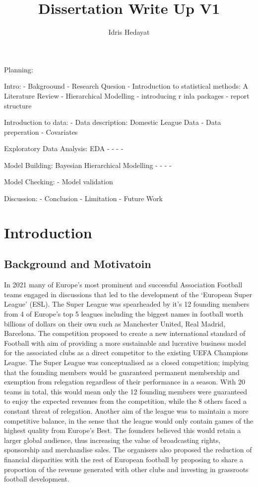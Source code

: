 \documentclass[
]{article}
\title{Dissertation Write Up V1}
\author{Idris Hedayat}
\date{}
\begin{document}
\maketitle

{
\setcounter{tocdepth}{2}
\tableofcontents
}
Planning:

Intro: - Bakgroound - Research Quesion - Introduction to statistical
methods: A Literature Review - Hierarchical Modelling - introducing r
inla packages - report structure

Introduction to data: - Data description: Domestic League Data - Data
preperation - Covariates

Exploratory Data Analysis: EDA - - - -

Model Building: Bayesian Hierarchical Modelling - - - -

Model Checking: - Model validation

Discussion: - Conclusion - Limitation - Future Work

\hypertarget{introduction}{%
\section{Introduction}\label{introduction}}

\hypertarget{background-and-motivatoin}{%
\subsection{Background and Motivatoin}\label{background-and-motivatoin}}

In 2021 many of Europe's most prominent and successful Association
Football teams engaged in discussions that led to the development of the
`European Super League' (ESL). The Super League was spearheaded by it's
12 founding members from 4 of Europe's top 5 leagues including the
biggest names in football worth billions of dollars on their own such as
Manchester United, Real Madrid, Barcelona. The competition proposed to
create a new international standard of Football with aim of providing a
more sustainable and lucrative business model for the associated clubs
as a direct competitor to the existing UEFA Champions League. The Super
League was conceptualised as a closed competition; implying that the
founding members would be guaranteed permanent membership and exemption
from relegation regardless of their performance in a season. With 20
teams in total, this would mean only the 12 founding members were
guaranteed to enjoy the expected revenues from the competition, while
the 8 others faced a constant threat of relegation. Another aim of the
league was to maintain a more competitive balance, in the sense that the
league would only contain games of the highest quality from Europe's
Best. The founders believed this would retain a larger global audience,
thus increasing the value of broadcasting rights, sponsorship and
merchandise sales. The organisers also proposed the reduction of
financial disparities with the rest of European football by proposing to
share a proportion of the revenue generated with other clubs and
investing in grassroots football development.
\end{document}
